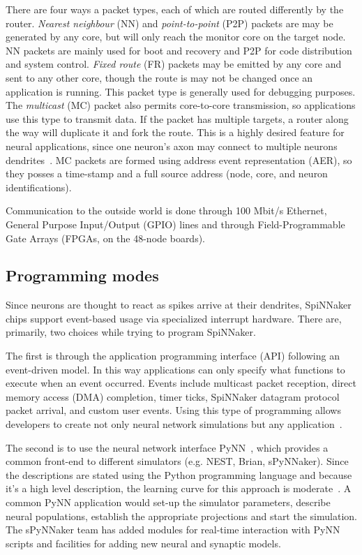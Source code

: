 There are four ways a packet types, each of which are routed differently by the router. \emph{Nearest neighbour} (NN) and \emph{point-to-point} (P2P) packets are may be generated by any core, but will only reach the monitor core on the target node. NN packets are mainly used for boot and recovery and P2P for code distribution and system control. \emph{Fixed route} (FR) packets may be emitted by any core and sent to any other core, though the route is may not be changed once an application is running. This packet type is generally used for debugging purposes.
The \emph{multicast} (MC) packet also permits core-to-core transmission, so applications use this type to transmit data. If the packet has multiple targets, a router along the way will duplicate it and fork the route. This is a highly desired feature for neural applications, since one neuron's axon may connect to multiple neurons dendrites~\cite{spinn-net-patterson2012scalable}. MC packets are formed using address event representation (AER), so they posses a time-stamp and a full source address (node, core, and neuron identifications).

Communication to the outside world is done through 100 Mbit/s Ethernet, General Purpose Input/Output (GPIO) lines and through Field-Programmable Gate Arrays (FPGAs, on the 48-node boards).

\subsection{Programming modes}
Since neurons are thought to react as spikes arrive at their dendrites, SpiNNaker chips support event-based usage via specialized interrupt hardware. There are, primarily, two choices while trying to program SpiNNaker. 

The first is through the application programming interface (API) following an event-driven model. In this way applications can only specify what functions to execute when an event occurred. Events include multicast packet reception, direct memory access (DMA) completion, timer ticks, SpiNNaker datagram protocol packet arrival, and custom user events. Using this type of programming allows developers to create not only neural network simulations but any application~\cite{spinn-software-docs}. 

The second is to use the neural network interface PyNN~\cite{davison2008pynn}, which provides a common front-end to different simulators (e.g. NEST, Brian, sPyNNaker). Since the descriptions are stated using the Python programming language and because it's a high level description, the learning curve for this approach is moderate~\cite{spynnaker-github}. A common PyNN application would set-up the simulator parameters, describe neural populations, establish the appropriate projections and start the simulation. The sPyNNaker team has added modules for real-time interaction with PyNN scripts and facilities for adding new neural and synaptic models.